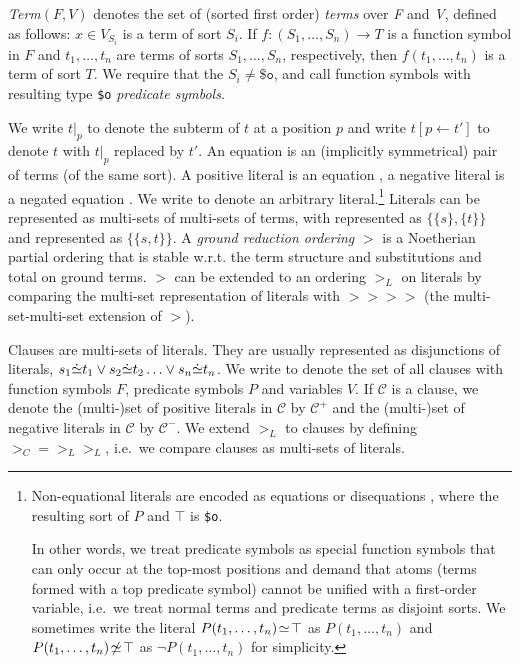 \documentclass{report}
\begin{document}
\emph{Term}$(F,V)$ denotes the set of (sorted first order)
\emph{terms} over \emph{F} and \emph{V}, defined as follows:
$x \in V_{S_i}$ is a term of sort $S_i$. If
$f:(S_1, \ldots, S_n) \to T$ is a function symbol in $F$ and
$t_1, \ldots, t_n$ are terms of sorts $S_1, \ldots, S_n$, respectively,
then $f(t_1, \ldots, t_n)$ is a term of sort $T$. We require that the
$S_i\not=\mathtt{\$o}$, and call function symbols with resulting type
\texttt{\$o} \emph{predicate symbols}.

We write $t|_p$ to denote the subterm of $t$ at a
position $p$ and write $t[p\leftarrow t']$ to denote $t$ with $t|_p$
replaced by $t'$. An equation  is an
(implicitly symmetrical) pair of terms (of the same sort). A positive
literal is an equation , a negative literal
is a negated equation .  We write  to denote an
arbitrary literal.\footnote{Non-equational literals are encoded as
  equations or disequations , where
  the resulting sort of $P$ and $\top$ is \texttt{\$o}.

  In other words, we treat predicate symbols as special function
  symbols that can only occur at the top-most positions and demand
  that atoms (terms formed with a top predicate symbol) cannot be
  unified with a first-order variable, i.e.\ we treat normal terms and
  predicate terms as disjoint sorts. We sometimes write the literal
  $P(t_1, \ldots, t_n)\!\simeq\!\top$ as $P(t_1, \ldots, t_n)$ and
  $P(t_1, \ldots, t_n)\!\not\simeq\!\top$ as $\neg P(t_1, \ldots, t_n)$ for
  simplicity.} Literals can be represented as multi-sets of multi-sets
of terms, with  represented as $\{\{s\},\{t\}\}$ and
 represented as $\{\{s, t\}\}$.  A \emph{ground reduction
  ordering} $>$ is a
Noetherian partial ordering that is stable w.r.t. the term structure
and substitutions and total on ground terms. $>$ can be extended to an
ordering $>_L$ on literals by comparing the multi-set representation
of literals with $>\!\!> >\!\!>$ (the multi-set-multi-set extension of
$>$).

Clauses are multi-sets of literals. They are usually represented as
disjunctions of literals, $s_1\dot{\simeq}t_1 \vee s_2\dot{\simeq}t_2 \ldots
\vee s_n\dot{\simeq}t_n$. We write  to denote the set
of all clauses with function symbols $F$, predicate symbols $P$ and
variables $V$. If $\mathcal{C}$ is a clause, we denote the (multi-)set
of positive literals in $\mathcal{C}$ by $\mathcal{C^+}$ and the
(multi-)set of negative literals in $\mathcal{C}$ by $\mathcal{C^-}$.
We extend $>_L$ to clauses by defining $>_C = >_L>_L$, i.e.\ we
compare clauses as multi-sets of literals.
\end{document}
